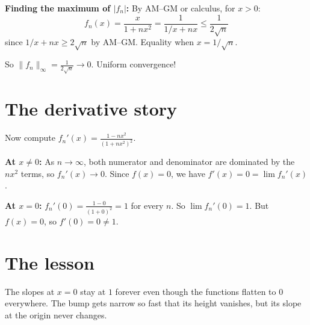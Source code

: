 \documentclass[12pt]{article}
\begin{document}
\textbf{Finding the maximum of $|f_n|$:} By AM--GM or calculus, for $x > 0$:
$$
f_n(x) = \frac{x}{1 + nx^2} = \frac{1}{1/x + nx} \leq \frac{1}{2\sqrt{n}}
$$
since $1/x + nx \geq 2\sqrt{n}$ by AM--GM. Equality when $x = 1/\sqrt{n}$.

So $\|f_n\|_\infty = \frac{1}{2\sqrt{n}} \to 0$. Uniform convergence!

\section*{The derivative story}

Now compute $f_n'(x) = \frac{1 - nx^2}{(1 + nx^2)^2}$.

\textbf{At $x \neq 0$:} As $n \to \infty$, both numerator and denominator are dominated by the $nx^2$ terms, so $f_n'(x) \to 0$. Since $f(x) = 0$, we have $f'(x) = 0 = \lim f_n'(x)$. \checkmark

\textbf{At $x = 0$:} $f_n'(0) = \frac{1 - 0}{(1+0)^2} = 1$ for every $n$. So $\lim f_n'(0) = 1$. But $f(x) = 0$, so $f'(0) = 0 \neq 1$. 

\section*{The lesson}

\begin{center}
\end{center}

The slopes at $x=0$ stay at $1$ forever even though the functions flatten to $0$ everywhere. The bump gets narrow so fast that its height vanishes, but its slope at the origin never changes.
\end{document}
